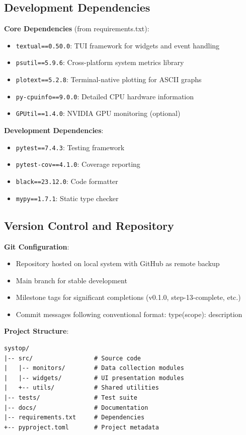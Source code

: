\documentclass[12pt,a4paper,oneside]{report}
\begin{document}
\subsection{Development Dependencies}

\textbf{Core Dependencies} (from requirements.txt):
\begin{itemize}
    \item \texttt{textual==0.50.0}: TUI framework for widgets and event handling
    \item \texttt{psutil==5.9.6}: Cross-platform system metrics library
    \item \texttt{plotext==5.2.8}: Terminal-native plotting for ASCII graphs
    \item \texttt{py-cpuinfo==9.0.0}: Detailed CPU hardware information
    \item \texttt{GPUtil==1.4.0}: NVIDIA GPU monitoring (optional)
\end{itemize}

\textbf{Development Dependencies}:
\begin{itemize}
    \item \texttt{pytest==7.4.3}: Testing framework
    \item \texttt{pytest-cov==4.1.0}: Coverage reporting
    \item \texttt{black==23.12.0}: Code formatter
    \item \texttt{mypy==1.7.1}: Static type checker
\end{itemize}

\subsection{Version Control and Repository}

\textbf{Git Configuration}:
\begin{itemize}
    \item Repository hosted on local system with GitHub as remote backup
    \item Main branch for stable development
    \item Milestone tags for significant completions (v0.1.0, step-13-complete, etc.)
    \item Commit messages following conventional format: type(scope): description
\end{itemize}

\textbf{Project Structure}:
\begin{verbatim}
systop/
|-- src/                 # Source code
|   |-- monitors/        # Data collection modules
|   |-- widgets/         # UI presentation modules
|   +-- utils/           # Shared utilities
|-- tests/               # Test suite
|-- docs/                # Documentation
|-- requirements.txt     # Dependencies
+-- pyproject.toml       # Project metadata
\end{verbatim}
\end{document}
